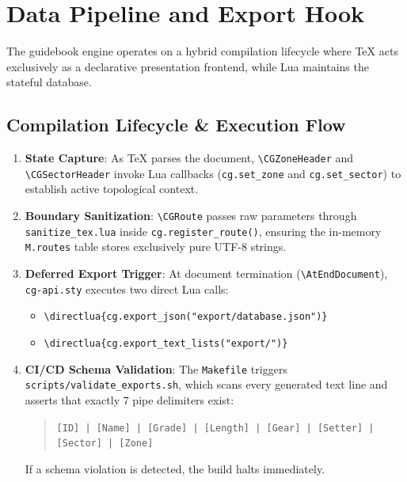 \section{Data Pipeline and Export Hook}

The guidebook engine operates on a hybrid compilation lifecycle where TeX acts exclusively as a declarative presentation frontend, while Lua maintains the stateful database.

\subsection{Compilation Lifecycle \& Execution Flow}

\begin{enumerate}
    \item \textbf{State Capture}: As TeX parses the document, \texttt{\textbackslash CGZoneHeader} and \texttt{\textbackslash CGSectorHeader} invoke Lua callbacks (\texttt{cg.set\_zone} and \texttt{cg.set\_sector}) to establish active topological context.
    \item \textbf{Boundary Sanitization}: \texttt{\textbackslash CGRoute} passes raw parameters through \texttt{sanitize\_tex.lua} inside \texttt{cg.register\_route()}, ensuring the in-memory \texttt{M.routes} table stores exclusively pure UTF-8 strings.
    \item \textbf{Deferred Export Trigger}: At document termination (\texttt{\textbackslash AtEndDocument}), \texttt{cg-api.sty} executes two direct Lua calls:
    \begin{itemize}
        \item \texttt{\textbackslash directlua\{cg.export\_json("export/database.json")\}}
        \item \texttt{\textbackslash directlua\{cg.export\_text\_lists("export/")\}}
    \end{itemize}
    \item \textbf{CI/CD Schema Validation}: The \texttt{Makefile} triggers \texttt{scripts/validate\_exports.sh}, which scans every generated text line and asserts that exactly 7 pipe delimiters exist:
    \begin{quote}
    \texttt{[ID] | [Name] | [Grade] | [Length] | [Gear] | [Setter] | [Sector] | [Zone]}
    \end{quote}
    If a schema violation is detected, the build halts immediately.
\end{enumerate}
